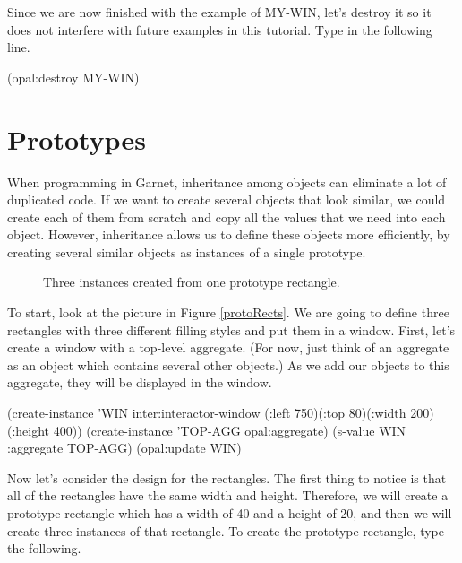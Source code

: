Since we are now finished with the example of MY-WIN, let's destroy it
so it does not interfere with future examples in this tutorial.  Type
in the following line.

\begin{programexample}
(opal:destroy MY-WIN)
\end{programexample}


\section{Prototypes}
\label{prototypes}

When programming in Garnet, inheritance among objects can eliminate a
lot of duplicated code.  If we want to create several objects that
look similar, we could create each of them from scratch and copy all
the values that we need into each object.  However, inheritance allows
us to define these objects more efficiently, by creating several
similar objects as instances of a single prototype.

\begin{figure}
\begin{center}
\end{center}
\caption{Three instances created from one prototype rectangle.}
\end{figure}

To start, look at the picture in Figure \ref{protoRects}.  We are
going to define three rectangles with three different filling styles
and put them in a window.  First, let's create a window with a
top-level aggregate.  (For now, just think of an aggregate as an
object which contains several other objects.)  As we add our objects
to this aggregate, they will be displayed in the window.

\begin{programexample}
(create-instance 'WIN inter:interactor-window
   (:left 750)(:top 80)(:width 200)(:height 400))
(create-instance 'TOP-AGG opal:aggregate)
(s-value WIN :aggregate TOP-AGG)
(opal:update WIN)
\end{programexample}

Now let's consider the design for the rectangles.  The first thing to
notice is that all of the rectangles have the same width and height.
Therefore, we will create a prototype rectangle which has a width of
40 and a height of 20, and then we will create three instances of that
rectangle.  To create the prototype rectangle, type the following.


